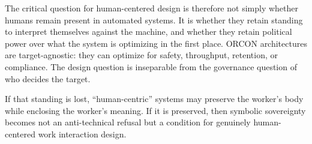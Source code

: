\documentclass[runningheads]{llncs}
\begin{document}
The critical question for human-centered design is therefore not simply whether humans remain present in automated systems. It is whether they retain standing to interpret themselves against the machine, and whether they retain political power over what the system is optimizing in the first place. ORCON architectures are target-agnostic: they can optimize for safety, throughput, retention, or compliance. The design question is inseparable from the governance question of who decides the target.

If that standing is lost, ``human-centric'' systems may preserve the worker's body while enclosing the worker's meaning. If it is preserved, then symbolic sovereignty becomes not an anti-technical refusal but a condition for genuinely human-centered work interaction design.

\end{document}
